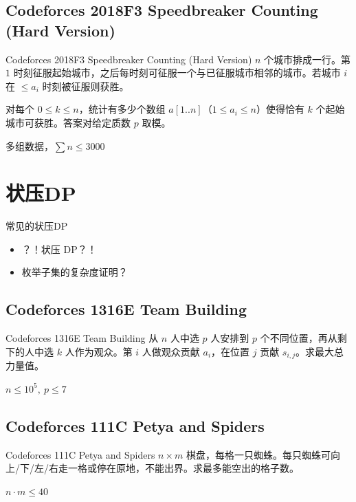 ﻿\documentclass[aspectratio=169]{ctexbeamer}
\begin{document}
\subsection{Codeforces 2018F3 Speedbreaker Counting (Hard Version)}
\begin{frame}{Codeforces 2018F3 Speedbreaker Counting (Hard Version)}
    $n$ 个城市排成一行。第 $1$ 时刻征服起始城市，之后每时刻可征服一个与已征服城市相邻的城市。若城市 $i$ 在 $\le a_i$ 时刻被征服则获胜。
    
    对每个 $0\le k\le n$，统计有多少个数组 $a[1..n]$（$1\le a_i\le n$）使得恰有 $k$ 个起始城市可获胜。答案对给定质数 $p$ 取模。
    
    多组数据，$\sum n\le 3000$
\end{frame}












\section{状压DP}

\begin{frame}{常见的状压DP}
    \begin{itemize}
        \item ？！状压 DP？！
        \item 枚举子集的复杂度证明？
    \end{itemize}
\end{frame}

\subsection{Codeforces 1316E Team Building}
\begin{frame}{Codeforces 1316E Team Building}
    从 $n$ 人中选 $p$ 人安排到 $p$ 个不同位置，再从剩下的人中选 $k$ 人作为观众。第 $i$ 人做观众贡献 $a_i$，在位置 $j$ 贡献 $s_{i,j}$。求最大总力量值。
    
    $n\le 10^5,\ p\le 7$
\end{frame}

\subsection{Codeforces 111C Petya and Spiders}
\begin{frame}{Codeforces 111C Petya and Spiders}
    $n\times m$ 棋盘，每格一只蜘蛛。每只蜘蛛可向上/下/左/右走一格或停在原地，不能出界。求最多能空出的格子数。
    
    $n\cdot m\le 40$
\end{frame}
\end{document}
